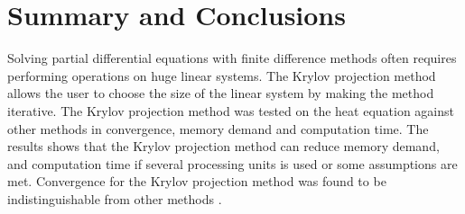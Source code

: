 \section*{Summary and Conclusions}
Solving partial differential equations with finite difference methods often requires performing operations on huge linear systems. The Krylov projection method allows the user to choose the size of the linear system by making the method iterative. The Krylov projection method was tested on the heat equation against other methods in convergence, memory demand and computation time. The results shows that the Krylov projection method can reduce memory demand, and computation time if several processing units is used or some assumptions are met. Convergence for the Krylov projection method was found to be indistinguishable from other methods .

